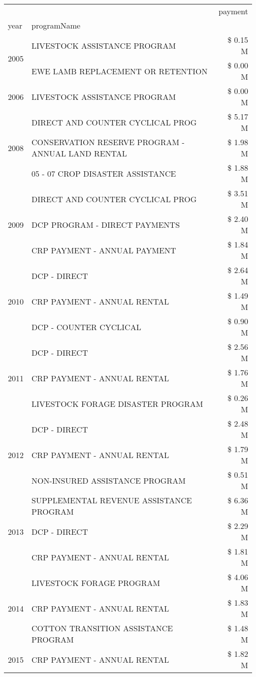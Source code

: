 \begin{tabular}{llr}
\toprule
 &  & payment \\
year & programName &  \\
\midrule
\multirow[t]{2}{*}{2005} & LIVESTOCK ASSISTANCE PROGRAM & \$ 0.15 M \\
 & EWE LAMB REPLACEMENT OR RETENTION & \$ 0.00 M \\
\cline{1-3}
2006 & LIVESTOCK ASSISTANCE PROGRAM & \$ 0.00 M \\
\cline{1-3}
\multirow[t]{3}{*}{2008} & DIRECT AND COUNTER CYCLICAL PROG & \$ 5.17 M \\
 & CONSERVATION RESERVE PROGRAM - ANNUAL LAND RENTAL & \$ 1.98 M \\
 & 05 - 07 CROP DISASTER ASSISTANCE & \$ 1.88 M \\
\cline{1-3}
\multirow[t]{3}{*}{2009} & DIRECT AND COUNTER CYCLICAL PROG & \$ 3.51 M \\
 & DCP PROGRAM - DIRECT PAYMENTS & \$ 2.40 M \\
 & CRP PAYMENT - ANNUAL PAYMENT & \$ 1.84 M \\
\cline{1-3}
\multirow[t]{3}{*}{2010} & DCP - DIRECT & \$ 2.64 M \\
 & CRP PAYMENT - ANNUAL RENTAL & \$ 1.49 M \\
 & DCP - COUNTER CYCLICAL & \$ 0.90 M \\
\cline{1-3}
\multirow[t]{3}{*}{2011} & DCP - DIRECT & \$ 2.56 M \\
 & CRP PAYMENT - ANNUAL RENTAL & \$ 1.76 M \\
 & LIVESTOCK FORAGE DISASTER PROGRAM & \$ 0.26 M \\
\cline{1-3}
\multirow[t]{3}{*}{2012} & DCP - DIRECT & \$ 2.48 M \\
 & CRP PAYMENT - ANNUAL RENTAL & \$ 1.79 M \\
 & NON-INSURED ASSISTANCE PROGRAM & \$ 0.51 M \\
\cline{1-3}
\multirow[t]{3}{*}{2013} & SUPPLEMENTAL REVENUE ASSISTANCE PROGRAM & \$ 6.36 M \\
 & DCP - DIRECT & \$ 2.29 M \\
 & CRP PAYMENT - ANNUAL RENTAL & \$ 1.81 M \\
\cline{1-3}
\multirow[t]{3}{*}{2014} & LIVESTOCK FORAGE PROGRAM & \$ 4.06 M \\
 & CRP PAYMENT - ANNUAL RENTAL & \$ 1.83 M \\
 & COTTON TRANSITION ASSISTANCE PROGRAM & \$ 1.48 M \\
\cline{1-3}
\multirow[t]{3}{*}{2015} & CRP PAYMENT - ANNUAL RENTAL & \$ 1.82 M \\

\end{tabular}

